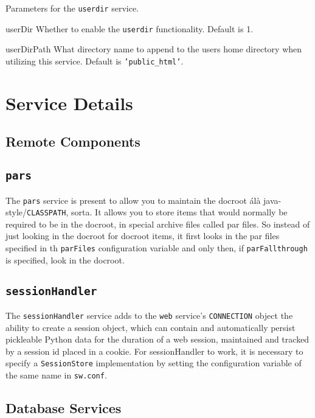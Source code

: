\documentclass[titlepage]{manual}
\begin{document}
Parameters for the \texttt{userdir} service.
\begin{argdesc}
\item[userDir] Whether to enable the \texttt{userdir} functionality.  Default
is 1.
\item[userDirPath] What directory name to append to the users home directory
when utilizing this service.  Default is \texttt{'public_html'}.
\end{argdesc}

\chapter{Service Details}

\section{Remote Components}
\label{remotecomponents}


\section{\texttt{pars}}

The \texttt{pars} service is present to allow you to maintain the
docroot \'al\`a java-style/\texttt{CLASSPATH}, sorta.  It allows you
to store items that would normally be required to be in the docroot,
in special archive files called par files.  So instead of just looking
in the docroot for docroot items, it first looks in the par files
specified in th \texttt{parFiles} configuration variable and only
then, if \texttt{parFallthrough} is specified, look in the docroot.

\section{\texttt{sessionHandler}}
The \texttt{sessionHandler} service adds to the \texttt{web}
service's \texttt{CONNECTION} object the ability to create a session object,
which can contain and automatically persist pickleable Python data for the 
duration of a web session, maintained and tracked by a session id placed 
in a cookie.  For sessionHandler to work, it is necessary to specify a 
\texttt{SessionStore} implementation by setting the configuration variable of
the same name in \texttt{sw.conf}.

\section{Database Services}
\label{databaseservices}
\end{document}
